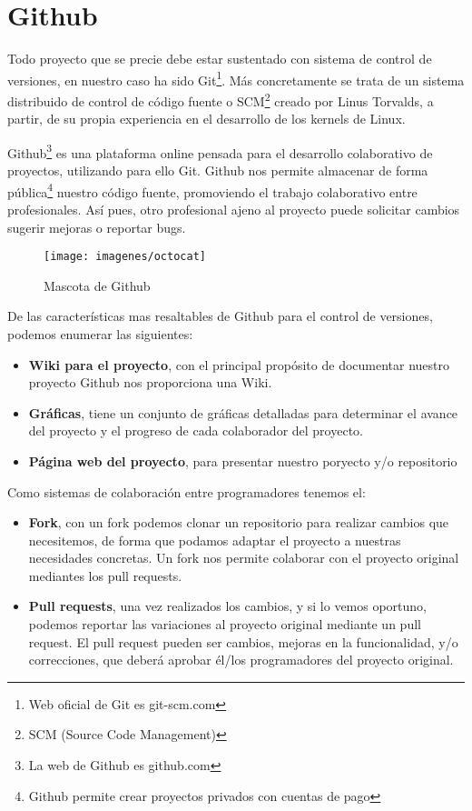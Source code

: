 \section{Github}


Todo proyecto que se precie debe estar sustentado con sistema de control de versiones, en nuestro caso ha sido Git\footnote{Web oficial de Git es git-scm.com}. Más concretamente se trata de un sistema distribuido de control de código fuente o SCM\footnote{SCM (Source Code Management)} creado por Linus Torvalds, a partir, de su propia experiencia en el desarrollo de los kernels de Linux. 

Github\footnote{La web de Github es github.com} es una plataforma online pensada para el desarrollo colaborativo de proyectos, utilizando para ello Git. Github nos permite almacenar de forma pública\footnote{Github permite crear proyectos privados con cuentas de pago} nuestro código fuente, promoviendo el trabajo colaborativo entre profesionales. Así pues, otro profesional ajeno al proyecto puede solicitar cambios sugerir mejoras o reportar bugs.

\begin{wrapfigure}{l}{0.4\textwidth}
  \begin{center}
    \texttt{[image: imagenes/octocat]}
  \end{center}
  \caption{Mascota de Github}
	\label{fig:octocat}
\end{wrapfigure}

De las características mas resaltables de Github para el control de versiones, podemos enumerar las siguientes:
\begin{itemize}
\item \textbf{Wiki para el proyecto}, con el principal propósito de documentar nuestro proyecto Github nos proporciona una Wiki. 
\item \textbf{Gráficas}, tiene un conjunto de gráficas detalladas para determinar el avance del proyecto y el progreso de cada colaborador del proyecto.
\item \textbf{Página web del proyecto}, para presentar nuestro poryecto y/o repositorio 
\end{itemize}

Como sistemas de colaboración entre programadores tenemos el:
\begin{itemize}
\item \textbf{Fork}, con un fork podemos clonar un repositorio para realizar cambios que necesitemos, de forma que podamos adaptar el proyecto a nuestras necesidades concretas. Un fork nos permite colaborar con el proyecto original mediantes los pull requests.
\item \textbf{Pull requests}, una vez realizados los cambios, y si lo vemos oportuno, podemos reportar las variaciones al proyecto original mediante un pull request. El pull request pueden ser cambios, mejoras en la funcionalidad, y/o correcciones, que deberá aprobar él/los programadores del proyecto original. 
\end{itemize}

